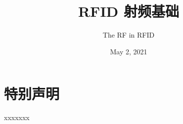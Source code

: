\documentclass[cn,10pt,math=newtx,citestyle=gb7714-2015,bibstyle=gb7714-2015]{elegantbook}
\title{RFID 射频基础}
\subtitle{The RF in RFID}
\date{May 2, 2021}
\begin{document}
\maketitle
\frontmatter

\chapter*{特别声明}




\begin{flushright}
xxxxxxx
\end{flushright}

\tableofcontents

\mainmatter




\end{document}

